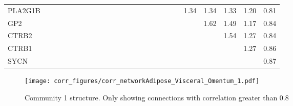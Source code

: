 \begin{longtable}{lrrrrrrrrrrrrrrrrrrrrrrrr}
PLA2G1B  &              &              &              &              &             &             &             &             &              &            &            &            &             &             &           &             &                &           &               &      1.34 &        1.34 &        1.33 &       1.20 &        0.81 \\
GP2      &              &              &              &              &             &             &             &             &              &            &            &            &             &             &           &             &                &           &               &           &        1.62 &        1.49 &       1.17 &        0.84 \\
CTRB2    &              &              &              &              &             &             &             &             &              &            &            &            &             &             &           &             &                &           &               &           &             &        1.54 &       1.27 &        0.84 \\
CTRB1    &              &              &              &              &             &             &             &             &              &            &            &            &             &             &           &             &                &           &               &           &             &             &       1.27 &        0.86 \\
SYCN     &              &              &              &              &             &             &             &             &              &            &            &            &             &             &           &             &                &           &               &           &             &             &            &        0.87 \\
\end{longtable}


\begin{figure}[h!]
\centering
\texttt{[image: corr\_figures/corr\_networkAdipose\_Visceral\_Omentum\_1.pdf]}
\caption{Community 1 structure. Only showing connections with correlation greater than 0.8}
\end{figure}




